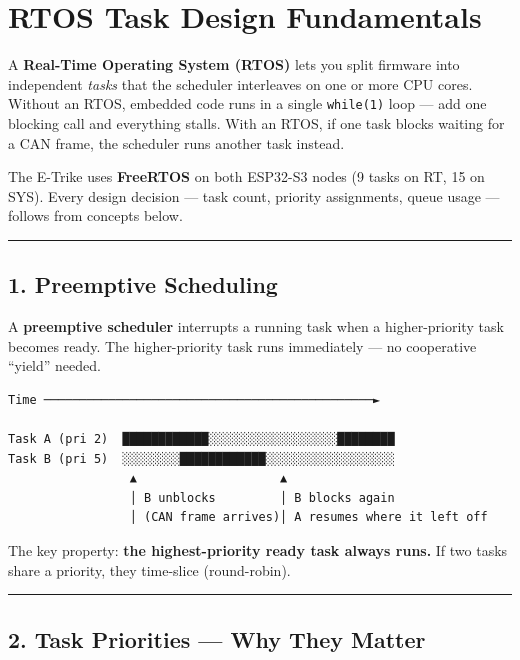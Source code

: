 \documentclass[12pt,a4paper,oneside]{report}
\begin{document}
\chapter{RTOS Task Design Fundamentals}\label{rtos-task-design-fundamentals}

A \textbf{Real-Time Operating System (RTOS)} lets you split firmware into
independent \emph{tasks} that the scheduler interleaves on one or more CPU
cores. Without an RTOS, embedded code runs in a single \texttt{while(1)} loop
--- add one blocking call and everything stalls. With an RTOS, if one task
blocks waiting for a CAN frame, the scheduler runs another task instead.

The E-Trike uses \textbf{FreeRTOS} on both ESP32-S3 nodes (9 tasks on RT, 15 on
SYS). Every design decision --- task count, priority assignments, queue usage
--- follows from concepts below.

\begin{center}\rule{0.5\linewidth}{0.5pt}\end{center}

\section{1. Preemptive Scheduling}\label{preemptive-scheduling}

A \textbf{preemptive scheduler} interrupts a running task when a higher-priority
task becomes ready. The higher-priority task runs immediately --- no cooperative
``yield'' needed.

\begin{verbatim}
Time ──────────────────────────────────────────────►

Task A (pri 2)  ████████████░░░░░░░░░░░░░░░░░░████████
Task B (pri 5)  ░░░░░░░░████████████░░░░░░░░░░░░░░░░░░
                 ▲                    ▲
                 │ B unblocks         │ B blocks again
                 │ (CAN frame arrives)│ A resumes where it left off
\end{verbatim}

The key property: \textbf{the highest-priority ready task always runs.} If two
tasks share a priority, they time-slice (round-robin).

\begin{center}\rule{0.5\linewidth}{0.5pt}\end{center}

\section{2. Task Priorities --- Why They
Matter}\label{task-priorities-why-they-matter}
\end{document}
